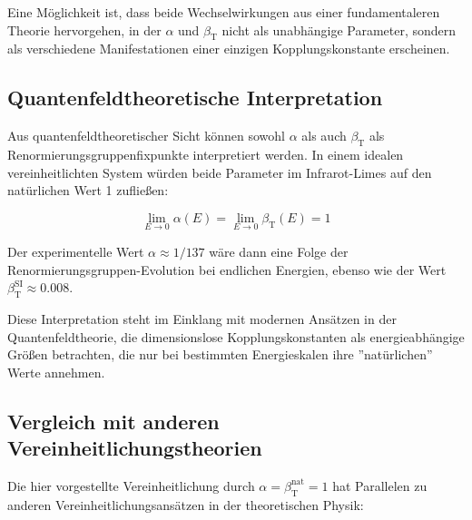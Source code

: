 \documentclass[12pt,a4paper]{article}
\newcommand{\betaT}{\beta_{\text{T}}}
\begin{document}
	Eine Möglichkeit ist, dass beide Wechselwirkungen aus einer fundamentaleren Theorie hervorgehen, in der \(\alpha\) und \(\betaT\) nicht als unabhängige Parameter, sondern als verschiedene Manifestationen einer einzigen Kopplungskonstante erscheinen.
	
	\subsection{Quantenfeldtheoretische Interpretation}
	
	Aus quantenfeldtheoretischer Sicht können sowohl \(\alpha\) als auch \(\betaT\) als Renormierungsgruppenfixpunkte interpretiert werden. In einem idealen vereinheitlichten System würden beide Parameter im Infrarot-Limes auf den natürlichen Wert 1 zufließen:
	
	\begin{equation}
		\lim_{E \to 0} \alpha(E) = \lim_{E \to 0} \betaT(E) = 1
	\end{equation}
	
	Der experimentelle Wert \(\alpha \approx 1/137\) wäre dann eine Folge der Renormierungsgruppen-Evolution bei endlichen Energien, ebenso wie der Wert \(\betaT^{\text{SI}} \approx 0.008\).
	
	Diese Interpretation steht im Einklang mit modernen Ansätzen in der Quantenfeldtheorie, die dimensionslose Kopplungskonstanten als energieabhängige Größen betrachten, die nur bei bestimmten Energieskalen ihre ''natürlichen'' Werte annehmen.
	
	\subsection{Vergleich mit anderen Vereinheitlichungstheorien}
	
	Die hier vorgestellte Vereinheitlichung durch \(\alpha = \betaT^{\text{nat}} = 1\) hat Parallelen zu anderen Vereinheitlichungsansätzen in der theoretischen Physik:
	
\end{document}
